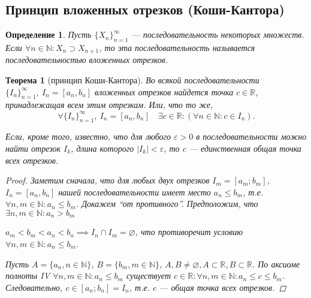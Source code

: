 \documentclass[a4paper,12pt]{article} %
\newtheorem{definition}{Определение}[section]
\newtheorem{theorem}{Теорема}[section]
\theoremstyle{remark}
\theoremstyle{definition}
\begin{document}
\subsection{Принцип вложенных отрезков (Коши-Кантора)}
\begin{definition}
	Пусть $\{X_n\}_{n=1}^{\infty}$ --- последовательность некоторых множеств. Если $\forall n\in \mathbb{N}:X_n\supset X_{n+1}$, то эта последовательность называется последовательностью вложенных отрезков.
\end{definition}
\begin{theorem}[принцип Коши-Кантора]
	Во всякой последовательности $\{I_n\}_{n=1}^{\infty}, \ I_n = [a_n, b_n]$ вложенных отрезков найдется точка $c \in \mathbb{R}$, принадлежащая всем этим отрезкам. Или, что то же,
	\[
	\forall \{I_n\}_{n=1}^{\infty}, \ I_n = [a_n, b_n] \quad \exists c\in \mathbb{R} : (\forall n\in \mathbb{N} : c \in I_n)
	.\] 

	Если, кроме того, известно, что для любого $\varepsilon > 0$ в последовательности можно найти отрезок $I_k$, длина которого $|I_k| < \varepsilon$, то $c$ --- единственная общая точка всех отрезков.
\begin{proof}
	Заметим сначала, что для любых двух отрезков $I_m = [a_m; b_m]$,  $I_n = [a_n, b_n]$ нашей последовательности имеет место $a_n \le b_m$, т.е. $\forall n, m \in  \mathbb{N} : a_n \le b_m$. Докажем ``от противного''. Предположим, что $\exists n, m \in  \mathbb{N} : a_n > b_m$	
\begin{center}
\end{center}
$a_m < b_m < a_n < b_n \implies I_n \cap I_m = \varnothing$, что противоречит условию $\forall n, m \in  \mathbb{N} : a_n \le b_m$.

Пусть $A = \{a_n, n \in  \mathbb{N}\}$, $B = \{b_m, m \in \mathbb{N}\}$, $A, B \neq \varnothing, A \subset \mathbb{R}, B \subset \mathbb{R}$. По аксиоме полноты IV $\forall n, m \in \mathbb{N} : a_n \le b_m$ существует $c\in \mathbb{R} : \forall n, m \in  \mathbb{N} : a_n \le  c \le  b_m$. Следовательно, $c\in [a_n; b_n] = I_n$, т.е. $c$ --- общая точка всех отрезков.


\end{proof}
\end{theorem}
\end{document}
